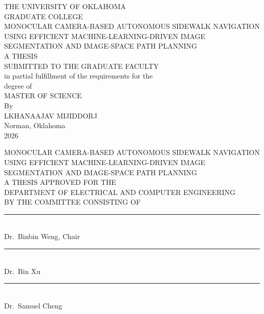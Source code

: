 \documentclass[12pt,letterpaper,oneside]{report}
\newcommand{\thesistitle}{Monocular Camera-Based Autonomous Sidewalk Navigation Using Efficient Machine-Learning-Driven Image Segmentation and Image-Space Path Planning}
\newcommand{\authorname}{Lkhanaajav Mijiddorj}
\newcommand{\degreename}{Master of Science}
\newcommand{\departmentname}{Department of Electrical and Computer Engineering}
\newcommand{\thesisyear}{2026}
\newcommand{\advisorname}{Dr.\ Binbin Weng}
\begin{document}

\begin{titlepage}
\begin{center}
\vspace*{1in}
THE UNIVERSITY OF OKLAHOMA\\
GRADUATE COLLEGE\\[2em]

{\Large \MakeUppercase{\thesistitle}}\\[3em]

A THESIS\\[1em]
SUBMITTED TO THE GRADUATE FACULTY\\
in partial fulfillment of the requirements for the\\
degree of\\[1em]
{\large \MakeUppercase{\degreename}}\\[3em]

By\\[1em]
{\large \MakeUppercase{\authorname}}\\
Norman, Oklahoma\\
\thesisyear
\end{center}
\end{titlepage}

\thispagestyle{empty}
\begin{center}
\vspace*{1in}
{\Large \MakeUppercase{\thesistitle}}\\[3em]

A THESIS APPROVED FOR THE\\
\MakeUppercase{\departmentname}\\[3em]

BY THE COMMITTEE CONSISTING OF\\[3em]

\rule{3.5in}{0.4pt}\\
\advisorname, Chair\\[2em]

\rule{3.5in}{0.4pt}\\
Dr.\ Bin Xu\\[2em]

\rule{3.5in}{0.4pt}\\
Dr.\ Samuel Cheng\\[2em]

\end{center}
\newpage
\end{document}

